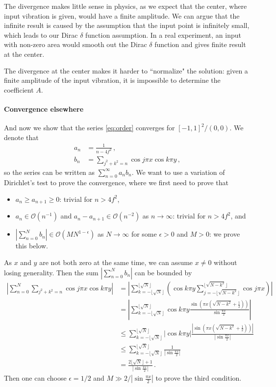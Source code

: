 \documentclass[]{article}
\begin{document}
The divergence makes little sense in physics, as we expect that the center, where input vibration is given, would have a finite amplitude. We can argue that the infinite result is caused by the assumption that the input point is infinitely small, which leads to our Dirac $\delta$ function assumption. In a real experiment, an input with non-zero area would smooth out the Dirac $\delta$ function and gives finite result at the center.

The divergence at the center makes it harder to ``normalize" the solution: given a finite amplitude of the input vibration, it is impossible to determine the coefficient $A$.

\paragraph{Convergence elsewhere} And now we show that the series \eqref{eq:order} converges for $[-1, 1]^2 \slash {(0, 0)}$. We denote that
\begin{align}
a_n &= \frac{1}{n - 4f^2}\,,\\
b_n &= \sum_{j^2+k^2=n} \cos j\pi x \cos k\pi y\,,
\end{align}
so the series can be written as $\sum_{n=0}^\infty a_nb_n$. We want to use a variation of Dirichlet's test to prove the convergence, where we first need to prove that
\begin{itemize}
\item $a_n \ge a_{n+1} \ge 0$: trivial for $n>4f^2$,
\item $a_n \in \mathcal{O}(n^{-1})$ and $a_n - a_{n+1} \in \mathcal{O}(n^{-2})$ as $n\to\infty$: trivial for $n>4f^2$, and
\item $|\sum_{n=0}^N b_n| \in\mathcal{O}(MN^{1-\epsilon})$  as $N\to\infty$  for some $\epsilon > 0$ and $M > 0$: we prove this below.
\end{itemize}
As $x$ and $y$ are not both zero at the same time, we can assume $x\ne0$ without losing generality. Then the sum $|\sum_{n=0}^N b_n|$ can be bounded by
\begin{align*}
\left|\sum_{n=0}^{N}\sum_{j^2+k^2=n} \cos j\pi x \cos k\pi y\right| 
&=\left|\sum_{k=-\lfloor\sqrt{N}\rfloor}^{\lfloor\sqrt{N}\rfloor}\left(\cos k\pi y \sum_{j=-\lfloor\sqrt{N - k^2}\rfloor}^{\lfloor\sqrt{N - k^2}\rfloor} \cos j\pi x \right)\right|\\
&=\left|\sum_{k=-\lfloor\sqrt{N}\rfloor}^{\lfloor\sqrt{N}\rfloor}\cos k\pi y \frac{\sin\left(\pi x (\sqrt{N - k^2}+\frac{1}{2})\right)}{\sin\frac{\pi x}{2}} \right|\\
&\le \sum_{k=-\lfloor\sqrt{N}\rfloor}^{\lfloor\sqrt{N}\rfloor}|\cos k\pi y| \frac{|\sin\left(\pi x (\sqrt{N - k^2}+\frac{1}{2})\right)|}{|\sin\frac{\pi x}{2}|}\\
&\le \sum_{k=-\lfloor\sqrt{N}\rfloor}^{\lfloor\sqrt{N}\rfloor} \frac{1}{|\sin\frac{\pi x}{2}|}\\
&=\frac{2\lfloor\sqrt{N}\rfloor+1}{|\sin\frac{\pi x}{2}|}\,.
\end{align*}
Then one can choose $\epsilon = 1/2$ and $M\gg 2/|\sin\frac{\pi x}{2}|$ to prove the third condition.
\end{document}
